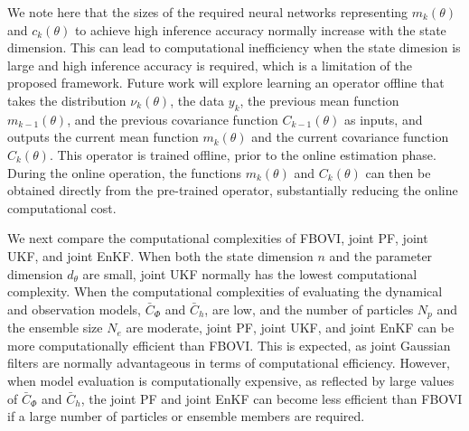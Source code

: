 \documentclass[preprint,3p,times]{elsarticle}
\begin{document}
We note here that the sizes of the required neural networks representing $m_k(\theta)$ and $c_k(\theta)$ to achieve high inference accuracy normally increase with the state dimension. This can lead to computational inefficiency when the state dimesion is large and high inference accuracy is required, which is a limitation of the proposed framework. Future work will explore learning an operator offline that takes the distribution $\nu_k(\theta)$, the data $y_k$, the previous mean function $m_{k-1}(\theta)$, and the previous covariance function $C_{k-1}(\theta)$ as inputs, and outputs the current mean function $m_k(\theta)$ and the current covariance function $C_k(\theta)$. This operator is trained offline, prior to the online estimation phase. During the online operation, the functions $m_k(\theta)$ and $C_k(\theta)$ can then be obtained directly from the pre-trained operator, substantially reducing the online computational cost.

We next compare the computational complexities of FBOVI, joint PF, joint UKF, and joint EnKF. When both the state dimension $n$ and the parameter dimension $d_{\theta}$ are small, joint UKF normally has the lowest computational complexity. When the computational complexities of evaluating the dynamical and observation models, $\bar{C}_{\Phi}$ and $\bar{C}_h$, are low, and the number of particles $N_p$ and the ensemble size $N_e$ are moderate, joint PF, joint UKF, and joint EnKF can be more computationally efficient than FBOVI. This is expected, as joint Gaussian filters are normally advantageous in terms of computational efficiency. However, when model evaluation is computationally expensive, as reflected by large values of $\bar{C}_{\Phi}$ and $\bar{C}_h$, the joint PF and joint EnKF can become less efficient than FBOVI if a large number of particles or ensemble members are required.
\end{document}
